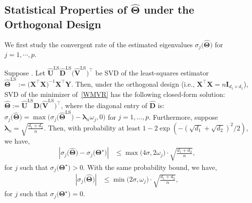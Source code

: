 \documentclass[alpha-refs]{wiley-article}
\begin{document}
\subsection{Statistical Properties of $\widehat{\boldsymbol{\Theta}}$ under the Orthogonal Design}
We first study the convergent rate of the estimated eigenvalues $\sigma_{j}\big(\widehat{\boldsymbol{\Theta}}\big)$ for $j = 1, \cdots, p$.

\begin{proposition} \label{clsed-form}
    Suppose .
    Let $\widehat{\boldsymbol{U}}^{\text{LS}}\widehat{\boldsymbol{D}}^{\text{LS}}\big(\widehat{\boldsymbol{V}}^{\text{LS}}\big)^{\top}$ be SVD of the least-squares estimator $\widehat{\boldsymbol{\Theta}}^{\text{LS}}:=\big(\boldsymbol{X}^{\top}\boldsymbol{X}\big)^{-1}\boldsymbol{X}^{\top}\boldsymbol{Y}$.
    Then, under the orthogonal design (i.e., $\boldsymbol{X}^{\top}\boldsymbol{X}=n\boldsymbol{I}_{d_{1} \times d_{1}}$), SVD of the minimizer of~\eqref{WMVR} has the following closed-form solution:
    $\widehat{\boldsymbol{\Theta}} := \widehat{\boldsymbol{U}}^{\text{LS}}\widehat{\boldsymbol{D}}\big(\widehat{\boldsymbol{V}}^{\text{LS}}\big)^{\top}$,
    where the diagonal entry of $\widehat{\boldsymbol{D}}$ is:
    $\sigma_{j}\big(\widehat{\boldsymbol{\Theta}}\big) = \max \big(  \sigma_{j}\big(\widehat{\boldsymbol{\Theta}}^{\text{LS}}\big)-\boldsymbol{\lambda}_{n} \omega_{j},0 \big)$ for $j=1,\dots,p$.
    Furthermore, suppose $\boldsymbol{\lambda}_{n}=\sqrt{\frac{d_{1}+d_{2}}{n}}$.
    Then, with probability at least $1-2\exp(-(\sqrt{d_{1}}+\sqrt{d_{2}})^{2}/2)$, we have,
    \begin{align} \label{sing1}
        \left| \sigma_{j}\big(\widehat{\boldsymbol{\Theta}}\big)-\sigma_{j}\big(\boldsymbol{\Theta}^{\star}\big)\right|
        &\leq \max\big(4\sigma,2\omega_{j}\big)\cdot \sqrt{\frac{d_{1}+d_{2}}{n}},
    \end{align}
    for $j$ such that $\sigma_{j}\big(\boldsymbol{\Theta}^{\star}\big)>0$.
    With the same probability bound, we have,
    \begin{align} \label{sing2}
        \left| \sigma_{j}\big(\widehat{\boldsymbol{\Theta}}\big)\right|
        &\leq \min\big(2\sigma,\omega_{j}\big)\cdot \sqrt{\frac{d_{1}+d_{2}}{n}},
    \end{align}
    for $j$ such that $\sigma_{j}\big(\boldsymbol{\Theta}^{\star}\big)=0$.
\end{proposition}
\end{document}
